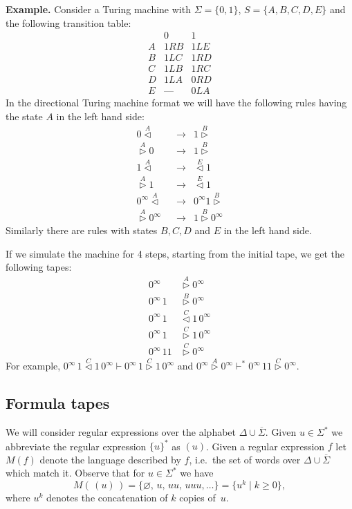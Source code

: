 \documentclass{article}
\newcommand{\lhead}[1]{\stackrel{#1}\triangleleft}
\newcommand{\rhead}[1]{\stackrel{#1}\triangleright}
\begin{document}
\noindent\textbf{Example.} Consider a Turing machine with \( \Sigma = \{ 0, 1 \} \), \( S = \{ A, B, C, D, E \} \) and the following transition table:
\[
	\begin{array}{l|ll}
		& 0 & 1\\
		\hline
		A &1RB & 1LE\\
		B & 1LC & 1RD\\
		C & 1LB & 1RC\\
		D & 1LA & 0RD\\
		E & \mbox{---} & 0LA
	\end{array}
\]
In the directional Turing machine format we will have the following rules having the state \( A \) in the left hand side:
\begin{align*}
	0 \lhead{A}\,\,\, &\to\,\,\, 1 \rhead{B}\\
	\rhead{A} 0\,\,\, &\to\,\,\, 1 \rhead{B}\\
	1 \lhead{A}\,\,\, &\to\,\,\, \lhead{E} 1\\
	\rhead{A} 1\,\,\, &\to\,\,\, \lhead{E} 1\\
	0^\infty \lhead{A}\,\,\, &\to\,\,\, 0^\infty 1 \rhead{B}\\
	\rhead{A} 0^\infty\,\,\, &\to\,\,\, 1 \rhead{B} 0^\infty
\end{align*}
Similarly there are rules with states \( B, C, D \) and \( E \) in the left hand side.

If we simulate the machine for 4 steps, starting from the initial tape, we get the following tapes:
\begin{align*}
	0^\infty &\rhead{A} 0^\infty\\
	0^\infty \, 1 &\rhead{B} 0^\infty\\
	0^\infty \, 1 &\lhead{C} 1\, 0^\infty\\
	0^\infty \, 1 &\rhead{C} 1\, 0^\infty\\
	0^\infty \, 1 1 &\rhead{C} 0^\infty
\end{align*}
For example, \( 0^\infty \, 1 \lhead{C} 1\, 0^\infty \vdash 0^\infty \, 1 \rhead{C} 1\, 0^\infty \) and \( 0^\infty \rhead{A} 0^\infty \vdash^* 0^\infty \, 1 1 \rhead{C} 0^\infty \).

\subsection{Formula tapes}

We will consider regular expressions over the alphabet \( \Delta \cup \overline{\Sigma} \).
Given \( u \in \Sigma^* \) we abbreviate the regular expression \( \{ u \}^* \) as \( (u) \).
Given a regular expression \( f \) let \( M(f) \) denote the language described by \( f \), i.e.\ the set of words over \( \Delta \cup \overline{\Sigma} \) which match it.
Observe that for \( u \in \Sigma^* \) we have
\[ M(\, (u)\, ) = \{ \varnothing,\, u,\, uu,\, uuu, \dots \} = \{ u^k \mid k \geq 0 \}, \]
where \( u^k \) denotes the concatenation of \( k \) copies of~\( u \).
\end{document}

